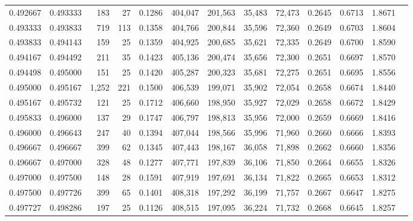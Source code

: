 \begin{tabular}{rrrrrrrrrrrrr}
0.492667 & 0.493333 &   183 &  27 &                                     0.1286 & 404,047 & 201,563 &  35,483 &  72,473 & 0.2645 & 0.6713 & 1.8671 \\
0.493333 & 0.493833 &   719 & 113 &                                     0.1358 & 404,766 & 200,844 &  35,596 &  72,360 & 0.2649 & 0.6703 & 1.8604 \\
0.493833 & 0.494143 &   159 &  25 &                                     0.1359 & 404,925 & 200,685 &  35,621 &  72,335 & 0.2649 & 0.6700 & 1.8590 \\
0.494167 & 0.494492 &   211 &  35 &                                     0.1423 & 405,136 & 200,474 &  35,656 &  72,300 & 0.2651 & 0.6697 & 1.8570 \\
0.494498 & 0.495000 &   151 &  25 &                                     0.1420 & 405,287 & 200,323 &  35,681 &  72,275 & 0.2651 & 0.6695 & 1.8556 \\
0.495000 & 0.495167 & 1,252 & 221 &                                     0.1500 & 406,539 & 199,071 &  35,902 &  72,054 & 0.2658 & 0.6674 & 1.8440 \\
0.495167 & 0.495732 &   121 &  25 &                                     0.1712 & 406,660 & 198,950 &  35,927 &  72,029 & 0.2658 & 0.6672 & 1.8429 \\
0.495833 & 0.496000 &   137 &  29 &                                     0.1747 & 406,797 & 198,813 &  35,956 &  72,000 & 0.2659 & 0.6669 & 1.8416 \\
0.496000 & 0.496643 &   247 &  40 &                                     0.1394 & 407,044 & 198,566 &  35,996 &  71,960 & 0.2660 & 0.6666 & 1.8393 \\
0.496667 & 0.496667 &   399 &  62 &                                     0.1345 & 407,443 & 198,167 &  36,058 &  71,898 & 0.2662 & 0.6660 & 1.8356 \\
0.496667 & 0.497000 &   328 &  48 &                                     0.1277 & 407,771 & 197,839 &  36,106 &  71,850 & 0.2664 & 0.6655 & 1.8326 \\
0.497000 & 0.497500 &   148 &  28 &                                     0.1591 & 407,919 & 197,691 &  36,134 &  71,822 & 0.2665 & 0.6653 & 1.8312 \\
0.497500 & 0.497726 &   399 &  65 &                                     0.1401 & 408,318 & 197,292 &  36,199 &  71,757 & 0.2667 & 0.6647 & 1.8275 \\
0.497727 & 0.498286 &   197 &  25 &                                     0.1126 & 408,515 & 197,095 &  36,224 &  71,732 & 0.2668 & 0.6645 & 1.8257 \\

\end{tabular}
